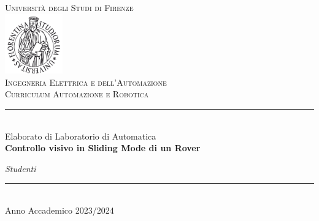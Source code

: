 \begin{titlepage}
    \begin{center}
        \textsc{\Large Universit\`a degli Studi di Firenze}\medskip
	    \\ [1.0cm]
		\includegraphics[width=25mm]{img/stemma}\\[.5cm]
		 \textsc{ Ingegneria Elettrica e dell'Automazione \\ Curriculum Automazione e Robotica}\medskip\\
		 \rule{50mm}{0.01mm}\medskip\\
		Elaborato di Laboratorio di Automatica \medskip\\
    \LARGE \textbf{ Controllo visivo in Sliding Mode di un Rover } 
    \normalsize  \vspace*{5\baselineskip}
    \medskip\\
       
         \end{center}
          \makeatletter
    \begin{minipage}[t]{65mm}
   \raggedright
   {\it Studenti}\newline
    \@author
   \end{minipage}%
		\makeatother
		
   \vfill
  \begin{center}
    \rule{40mm}{0.01mm}\\
    {Anno Accademico 2023/2024}
  \end{center}
\end{titlepage} 

